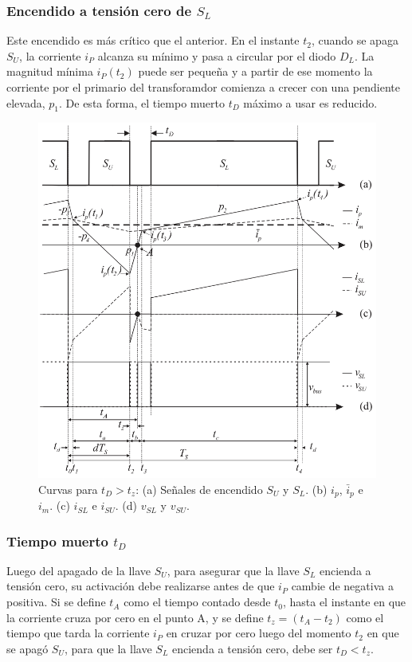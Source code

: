 \subsubsection{Encendido a tensión cero de $S_L$}

Este encendido es más crítico que el anterior. En el instante $t_2$, cuando se apaga $S_U$, la corriente $i_P$ alcanza su mínimo y pasa a circular por el diodo $D_L$. La magnitud mínima $i_P(t_2)$ puede ser pequeña y a partir de ese momento la corriente por el primario del transforamdor comienza a crecer con una pendiente elevada, $p_1$. De esta forma, el tiempo muerto $t_D$ máximo a usar es reducido.

\begin{figure}
	\centering
	\includegraphics[width=0.7\linewidth]{img/suave1}
	\caption{Curvas para \( t_D > t_z \): (a) Señales de encendido $S_U$ y $S_L$. (b) \( i_p \), \( \bar{i}_p \) e \( i_m \). (c) \( i_{SL} \) e \( i_{SU} \). (d) \( v_{SL} \) y \( v_{SU} \).}
	\label{fig:suave1}
\end{figure}

\subsubsection{Tiempo muerto $t_D$}

Luego del apagado de la llave $S_U$, para asegurar que la llave $S_L$ encienda a tensión cero, su activación debe realizarse antes de que $i_P$ cambie de negativa a positiva. Si se define $t_A$ como el tiempo contado desde $t_0$, hasta el instante en que la corriente cruza por cero en el punto A, y se define $t_z=(t_A-t_2)$ como el tiempo que tarda la corriente $i_P$ en cruzar por cero luego del momento $t_2$ en que se apagó $S_U$, para que la llave $S_L$ encienda a tensión cero, debe ser $t_D<t_z$.

